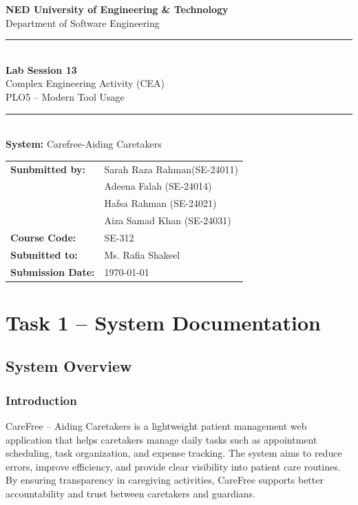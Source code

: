 \documentclass[12pt,a4paper]{article}
\begin{document}
\begin{titlepage}
    \centering
    \vspace*{1cm}

    {\Large \textbf{NED University of Engineering \& Technology}}\\[0.3cm]
    {\large Department of Software Engineering}\\[1.5cm]

    \rule{\linewidth}{0.5mm}\\[0.4cm]
    {\LARGE \textbf{Lab Session 13}}\\[0.2cm]
    {\Large Complex Engineering Activity (CEA)}\\[0.2cm]
    {\large PLO5 -- Modern Tool Usage}\\[0.2cm]
    \rule{\linewidth}{0.5mm}\\[1.5cm]

    {\large \textbf{System:} Carefree-Aiding Caretakers}\\[0.7cm]

    \begin{tabular}{ll}
        \textbf{Sunbmitted by:}    & Sarah Raza Rahman(SE-24011)\\
        & Adeena Falah (SE-24014)\\
        & Hafsa Rahman (SE-24021)\\
        & Aiza Samad Khan (SE-24031)\\[0.3cm]
        \textbf{Course Code:}     & SE-312        \\[0.3cm]
        \textbf{Submitted to:}      & Ms. Rafia Shakeel    \\[0.3cm]
        \textbf{Submission Date:} &  \today            \\
    \end{tabular}

    \vfill
\end{titlepage}

\tableofcontents
\newpage

\section{Task 1 -- System Documentation}

\subsection{System Overview}

\subsubsection{Introduction}
CareFree – Aiding Caretakers is a lightweight patient management web application that helps caretakers manage daily 
tasks such as appointment scheduling, task organization, and expense tracking. The system aims to reduce errors, 
improve efficiency, and provide clear visibility into patient care routines. By ensuring transparency in caregiving 
activities, CareFree supports better accountability and trust between caretakers and guardians.
\end{document}
